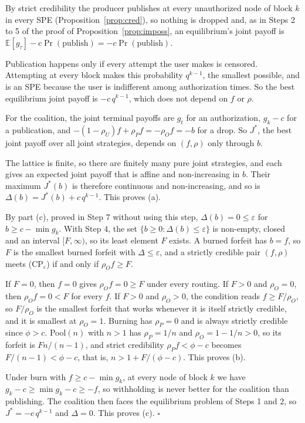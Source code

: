 \documentclass[11pt]{article}
\newcommand{\E}{\mathbb{E}}
\newenvironment{steps}{\begin{list}{}{\setlength{\leftmargin}{3.6em}\setlength{\labelwidth}{3.2em}\setlength{\labelsep}{0.4em}\setlength{\itemsep}{2pt}\setlength{\topsep}{3pt}\setlength{\parsep}{0pt}\renewcommand{\makelabel}[1]{##1\hfil}}}{\end{list}}
\begin{document}
\begin{steps}
\item[\emph{Step 1.}] By strict credibility the producer publishes at every unauthorized node of block $k$ in every SPE (Proposition~\ref{prop:cred}), so nothing is dropped and, as in Steps 2 to 5 of the proof of Proposition~\ref{prop:imposs}, an equilibrium's joint payoff is $\E[g_\tau]-c\Pr(\text{publish})=-c\Pr(\text{publish})$.
\item[\emph{Step 2.}] Publication happens only if every attempt the user makes is censored. Attempting at every block makes this probability $q^{k-1}$, the smallest possible, and is an SPE because the user is indifferent among authorization times. So the best equilibrium joint payoff is $-c\,q^{k-1}$, which does not depend on $f$ or $\rho$.
\item[\emph{Step 3.}] For the coalition, the joint terminal payoffs are $g_t$ for an authorization, $g_k-c$ for a publication, and $-(1-\rho_U)f+\rho_P f=-\rho_O f=-b$ for a drop. So $J^*$, the best joint payoff over all joint strategies, depends on $(f,\rho)$ only through $b$.
\item[\emph{Step 4.}] The lattice is finite, so there are finitely many pure joint strategies, and each gives an expected joint payoff that is affine and non-increasing in $b$. Their maximum $J^*(b)$ is therefore continuous and non-increasing, and so is $\Delta(b)=J^*(b)+c\,q^{k-1}$. This proves (a).
\item[\emph{Step 5.}] By part (c), proved in Step 7 without using this step, $\Delta(b)=0\le\varepsilon$ for $b\ge c-\min g_k$. With Step 4, the set $\{b\ge0:\Delta(b)\le\varepsilon\}$ is non-empty, closed and an interval $[F,\infty)$, so its least element $F$ exists. A burned forfeit has $b=f$, so $F$ is the smallest burned forfeit with $\Delta\le\varepsilon$, and a strictly credible pair $(f,\rho)$ meets (CP$_\varepsilon$) if and only if $\rho_O f\ge F$.
\item[\emph{Step 6.}] If $F=0$, then $f=0$ gives $\rho_O f=0\ge F$ under every routing. If $F>0$ and $\rho_O=0$, then $\rho_O f=0<F$ for every $f$. If $F>0$ and $\rho_O>0$, the condition reads $f\ge F/\rho_O$, so $F/\rho_O$ is the smallest forfeit that works whenever it is itself strictly credible, and it is smallest at $\rho_O=1$. Burning has $\rho_P=0$ and is always strictly credible since $\phi>c$. Pool$(n)$ with $n>1$ has $\rho_P=1/n$ and $\rho_O=1-1/n>0$, so its forfeit is $Fn/(n-1)$, and strict credibility $\rho_P f<\phi-c$ becomes $F/(n-1)<\phi-c$, that is, $n>1+F/(\phi-c)$. This proves (b).
\item[\emph{Step 7.}] Under burn with $f\ge c-\min g_k$, at every node of block $k$ we have $g_k-c\ge\min g_k-c\ge-f$, so withholding is never better for the coalition than publishing. The coalition then faces the equilibrium problem of Steps 1 and 2, so $J^*=-c\,q^{k-1}$ and $\Delta=0$. This proves (c). \hfill$\square$
\end{steps}
\end{document}
